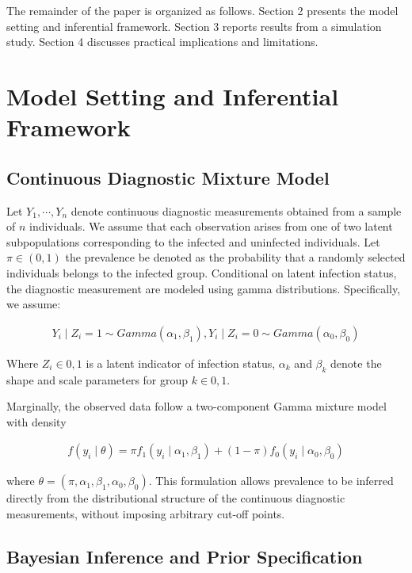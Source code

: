 \documentclass[11pt]{article}
\begin{document}
The remainder of the paper is organized as follows. Section 2 presents the model setting and inferential framework. Section 3 reports results from a simulation study. Section 4 discusses practical implications and limitations.



\section{Model Setting and Inferential Framework}
\subsection{Continuous Diagnostic Mixture Model}

Let $ Y_1, \cdots, Y_n $ denote continuous diagnostic measurements obtained from a sample of $n$ individuals. We assume that each observation arises from one of two latent subpopulations corresponding to the infected and uninfected individuals. Let $ \pi \in (0, 1) $ the prevalence be denoted as the probability that a randomly selected individuals belongs to the infected group. Conditional on latent infection status, the diagnostic measurement are modeled using gamma distributions. Specifically, we assume:

\begin{align*}
Y_i \mid Z_i = 1 \sim Gamma (\alpha_1, \beta_1), Y_i \mid Z_i = 0 \sim Gamma (\alpha_0, \beta_0) 
\end{align*}

Where $ Z_i \in {0,1}$ is a latent indicator of infection status, $\alpha_k$ and $ \beta_k$ denote the shape and scale parameters for group $k \in {0,1}.$

Marginally, the observed data follow a two-component Gamma mixture model with density

\begin{align*}
f(y_i \mid \theta) = \pi f_{1} (y_i \mid \alpha_1, \beta_1) + (1 - \pi) f_{0} (y_i \mid \alpha_0, \beta_0)
\end{align*}

where $\theta = (\pi, \alpha_1, \beta_1,\alpha_0, \beta_0).$ This formulation allows prevalence to be inferred directly from the distributional structure of the continuous diagnostic measurements, without imposing arbitrary cut-off points.

\subsection{Bayesian Inference and Prior Specification}
\end{document}
